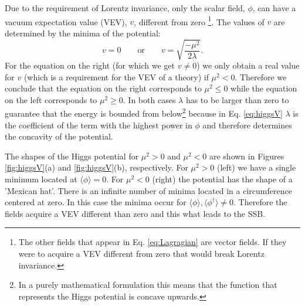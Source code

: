 Due to the requirement of Lorentz invariance, only the scalar field, $\phi$, can have a vacuum expectation value (VEV), $v$, different from zero \footnote{The other fields that appear in Eq. \ref{eq:Lagragian} are vector fields. If they were to acquire a VEV different from zero that would break Lorentz invariance.}. The values of $v$ are determined by the minima of the potential:
\begin{equation}
v=0 \qquad \text{or} \qquad v=\sqrt{\frac{-\mu^2}{2\lambda}}.
\end{equation}
For the equation on the right (for which we get $v\neq 0$) we only obtain a real value for $v$ (which is a requirement for the VEV of a theory) if $\mu^2<0$. Therefore we conclude that the equation on the right corresponds to $\mu^2\leq0$ while the equation on the left corresponds to $\mu^2\geq0$. In both cases $\lambda$ has to be larger than zero to guarantee that the energy is bounded from below\footnote{In a purely mathematical formulation this means that the function that represents the Higgs potential is concave upwards.} because in Eq. \ref{eq:higgsV} $\lambda$ is the coefficient of the term with the highest power in $\phi$ and therefore determines the concavity of the potential. 

The shapes of the Higgs potential for $\mu^2>0$ and $\mu^2<0$ are shown in Figures \ref{fig:higgsV}(a) and \ref{fig:higgsV}(b), respectively. For $\mu^2>0$ (left) we have a single minimum located at $\langle\phi\rangle=0$. For $\mu^2<0$ (right) the potential has the shape of a 'Mexican hat'. There is an infinite number of minima located in a circumference centered at zero. In this case the minima occur for $\langle\phi\rangle,\langle\phi^{\dagger}\rangle\neq 0$. Therefore the fields acquire a VEV different than zero and this what leads to the SSB.



